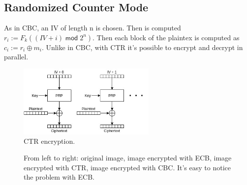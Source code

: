 \subsection{Randomized Counter Mode}
As in CBC, an IV of length n is chosen. Then is computed $r_i := F_k((IV + i)\;\mathsf{mod}\;2^n)$. Then each block of the plaintex is computed as $c_i := r_i \oplus m_i$. Unlike in CBC, with CTR it's possible to encrypt and decrypt in parallel.
\begin{figure}[H]
    \centering
    \includegraphics[width=0.6\textwidth]{img/private-key/ctr.jpg}
    \caption{CTR encryption.}
\end{figure}

\begin{figure}[h]
    \centering
    \caption{From left to right: original image, image encrypted with ECB, image encrypted with CTR, image encrypted with CBC. It's easy to notice the problem with ECB.}
\end{figure}
